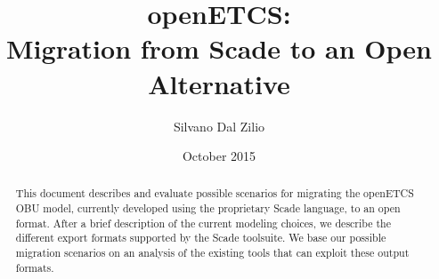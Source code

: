 \documentclass{template/openetcs_report}
\begin{document}
\frontmatter
{}




\title{openETCS:\\ Migration from Scade to an Open Alternative}

\subtitle{}

\date{October 2015}


\techassessorname{}
\techassessoraffil{}

\qualityassessorname{}
\qualityassessoraffil{}

\approvalname{}
\approvalaffil{}


\author{Silvano Dal Zilio}

  




\begin{abstract}
  This document describes and evaluate possible scenarios for
  migrating the openETCS OBU model, currently developed using the
  proprietary Scade language, to an open format. After a brief
  description of the current modeling choices, we describe the
  different export formats supported by the Scade toolsuite. We base
  our possible migration scenarios on an analysis of the existing
  tools that can exploit these output formats.
\end{abstract}
\end{document}
